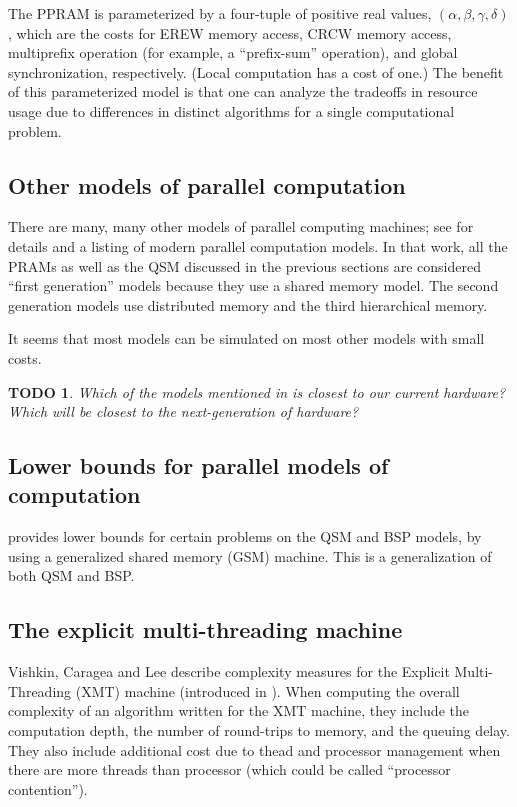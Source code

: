 \documentclass{article}
\newtheorem{todo}{TODO}
\begin{document}
The PPRAM is parameterized by a four-tuple of positive real values, $(\alpha, \beta, \gamma, \delta)$, which are the costs for EREW memory access, CRCW memory access, multiprefix operation (for example, a ``prefix-sum'' operation), and global synchronization, respectively.
(Local computation has a cost of one.)
The benefit of this parameterized model is that one can analyze the tradeoffs in resource usage due to differences in distinct algorithms for a single computational problem.

\subsection{Other models of parallel computation}

There are many, many other models of parallel computing machines; see \cite{zcsm07} for details and a listing of modern parallel computation models.
In that work, all the PRAMs as well as the QSM discussed in the previous sections are considered ``first generation'' models because they use a shared memory model.
The second generation models use distributed memory and the third hierarchical memory.

It seems that most models can be simulated on most other models with small costs.

\begin{todo}
  Which of the models mentioned in \cite{zcsm07} is closest to our current hardware?
  Which will be closest to the next-generation of hardware?
\end{todo}

\subsection{Lower bounds for parallel models of computation}

\cite{mr98} provides lower bounds for certain problems on the QSM and BSP models, by using a generalized shared memory (GSM) machine.
This is a generalization of both QSM and BSP.

\subsection{The explicit multi-threading machine}
Vishkin, Caragea and Lee \cite{vcl06} describe complexity measures for the Explicit Multi-Threading (XMT) machine (introduced in \cite{vdbn98}).
When computing the overall complexity of an algorithm written for the XMT machine, they include the computation depth, the number of round-trips to memory, and the queuing delay.
They also include additional cost due to thead and processor management when there are more threads than processor (which could be called ``processor contention'').
\end{document}
